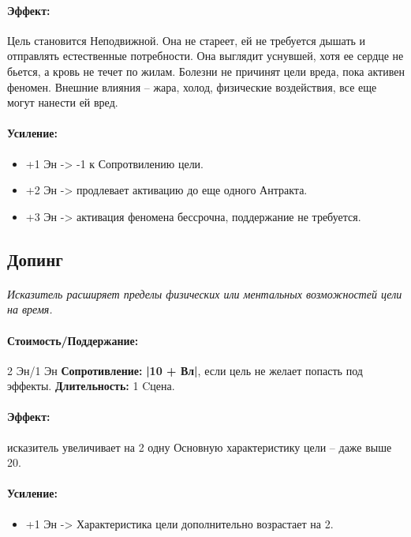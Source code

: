\paragraph{Эффект: }Цель становится Неподвижной. Она не стареет, ей не требуется дышать и отправлять естественные потребности. Она выглядит уснувшей, хотя ее сердце не бьется, а кровь не течет по жилам. Болезни не причинят цели вреда, пока активен феномен. Внешние влияния – жара, холод, физические воздействия, все еще могут нанести ей вред.
\paragraph{Усиление:}
\begin{itemize}
\item+1 Эн -> -1 к Сопротвилению цели.
\item+2 Эн -> продлевает активацию до еще одного Антракта.
\item+3 Эн -> активация феномена бессрочна, поддержание не требуется.
\end{itemize}
\subsection{Допинг}
\paragraph{} 
\textit{Исказитель расширяет пределы физических или ментальных возможностей цели на время.}
\paragraph{Стоимость/Поддержание: }2 Эн/1 Эн
\newline
\textbf{Сопротивление: }
\textbf{|10 + Вл|}, если цель не желает попасть под эффекты.
\newline 
\textbf{Длительность: }1 Cцена.
\paragraph{Эффект: }исказитель увеличивает на 2 одну Основную характеристику цели – даже выше 20.
\paragraph{Усиление:}
\begin{itemize}
\item+1 Эн -> Характеристика цели дополнительно возрастает на 2.
\end{itemize}

